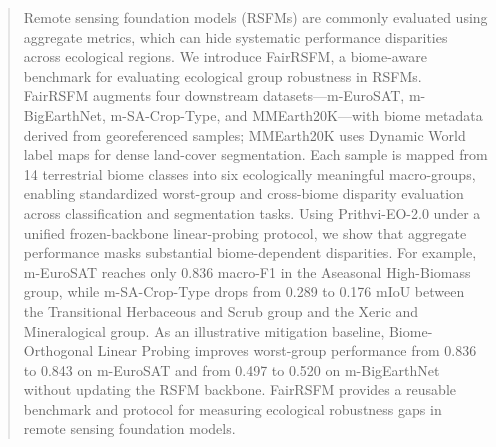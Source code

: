 \documentclass[10pt,twocolumn,letterpaper]{article}
\newcommand{\method}{FairRSFM\xspace}
\begin{document}
\begin{abstract}
Remote sensing foundation models (RSFMs) are commonly evaluated using aggregate metrics, which can hide systematic performance disparities across ecological regions. We introduce FairRSFM, a biome-aware benchmark for evaluating ecological group robustness in RSFMs. FairRSFM augments four downstream datasets---m-EuroSAT, m-BigEarthNet, m-SA-Crop-Type, and MMEarth20K---with biome metadata derived from georeferenced samples; MMEarth20K uses Dynamic World label maps for dense land-cover segmentation. Each sample is mapped from 14 terrestrial biome classes into six ecologically meaningful macro-groups, enabling standardized worst-group and cross-biome disparity evaluation across classification and segmentation tasks. Using Prithvi-EO-2.0 under a unified frozen-backbone linear-probing protocol, we show that aggregate performance masks substantial biome-dependent disparities. For example, m-EuroSAT reaches only 0.836 macro-F1 in the Aseasonal High-Biomass group, while m-SA-Crop-Type drops from 0.289 to 0.176 mIoU between the Transitional Herbaceous and Scrub group and the Xeric and Mineralogical group. As an illustrative mitigation baseline, Biome-Orthogonal Linear Probing improves worst-group performance from 0.836 to 0.843 on m-EuroSAT and from 0.497 to 0.520 on m-BigEarthNet without updating the RSFM backbone. FairRSFM provides a reusable benchmark and protocol for measuring ecological robustness gaps in remote sensing foundation models.
\end{abstract}

\end{document}
